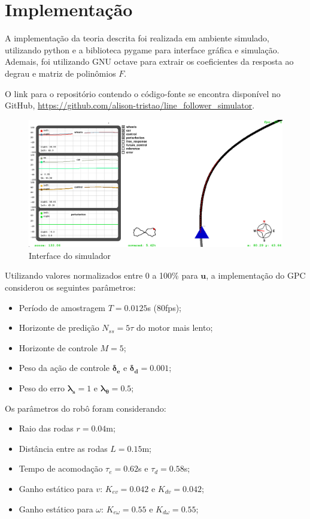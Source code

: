 \section{Implementação}

A implementação da teoria descrita foi realizada
em ambiente simulado, utilizando python e a biblioteca
pygame para interface gráfica e simulação. Ademais, 
foi utilizando GNU octave para extrair os coeficientes 
da resposta ao degrau e matriz de polinômios $F$.

\vspace{1em}
O link para o repositório contendo o código-fonte
se encontra disponível no GitHub, 
\url{https://github.com/alison-tristao/line_follower_simulator}.

\begin{figure}[H]
    \centering
    \includegraphics[width=1.0\textwidth]{figures/robot_silmulation.png}
    \caption{Interface do simulador}
    \label{fig:simulator}
\end{figure}

\vspace{1em}
Utilizando valores normalizados entre 0 a 100\% para $\mathbf{u}$,
a implementação do GPC considerou os seguintes parâmetros:

\begin{itemize}
    \item Período de amostragem $T = 0.0125$s (80fps);
    \item Horizonte de predição $N_{ss} = 5 \tau$ do motor mais lento;
    \item Horizonte de controle $M = 5$;
    \item Peso da ação de controle $\boldsymbol{\delta_e}$ e $\boldsymbol{\delta_d} = 0.001$;
    \item Peso do erro $\boldsymbol{\lambda_s} = 1$ e $\boldsymbol{\lambda_{\theta}} = 0.5$;
\end{itemize}

Os parâmetros do robô foram considerando:

\begin{itemize}
    \item Raio das rodas $r = 0.04$m;
    \item Distância entre as rodas $L = 0.15$m;
    \item Tempo de acomodação $\tau_e = 0.62$s e $\tau_d = 0.58$s;
    \item Ganho estático para $v$: $K_{ev} = 0.042$ e $K_{dv} = 0.042$;
    \item Ganho estático para $\omega$: $K_{e\omega} = 0.55$ e $K_{d\omega} = 0.55$;
\end{itemize}

